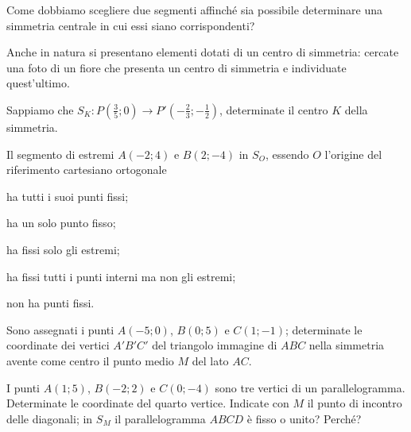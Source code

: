\begin{esercizio}
\label{ese:8.5}
Come dobbiamo scegliere due segmenti affinché sia possibile determinare una simmetria centrale in cui essi siano corrispondenti?
\end{esercizio}

\begin{esercizio}
\label{ese:8.6}
Anche in natura si presentano elementi dotati di un centro di simmetria: cercate una foto di un fiore che presenta un centro di simmetria e individuate quest'ultimo.
\end{esercizio}

\begin{esercizio}
\label{ese:8.7}
Sappiamo che $S_K:P\left(\frac{3}{5};0\right) \rightarrow P'\left(-\frac{2}{3};-\frac{1}{2}\right)$, determinate il centro $K$ della simmetria. 
\end{esercizio}

\begin{esercizio}
\label{ese:8.8}
Il segmento di estremi $A(-2;4)$ e $B(2;-4)$ in $S_O$, essendo $O$ l'origine del riferimento cartesiano ortogonale
\begin{enumeratea}
\item ha tutti i suoi punti fissi;
\item ha un solo punto fisso;
\item ha fissi solo gli estremi;
\item ha fissi tutti i punti interni ma non gli estremi;
\item non ha punti fissi.
\end{enumeratea}
\end{esercizio}

\begin{esercizio}
\label{ese:8.9}
Sono assegnati i punti $A(-5;0)$, $B(0;5)$ e $C(1;-1)$; determinate le coordinate dei vertici $A'B'C'$ del triangolo immagine di $ABC$ nella simmetria avente come centro il punto medio $M$ del lato $AC$.
\end{esercizio}

\begin{esercizio}
\label{ese:8.10}
I punti $A(1;5)$, $B(-2;2)$ e $C(0;-4)$ sono tre vertici di un parallelogramma. Determinate le coordinate del quarto vertice. Indicate con $M$ il punto di incontro delle diagonali; in $S_M$ il parallelogramma $ABCD$ è fisso o unito? Perché?
\end{esercizio}

